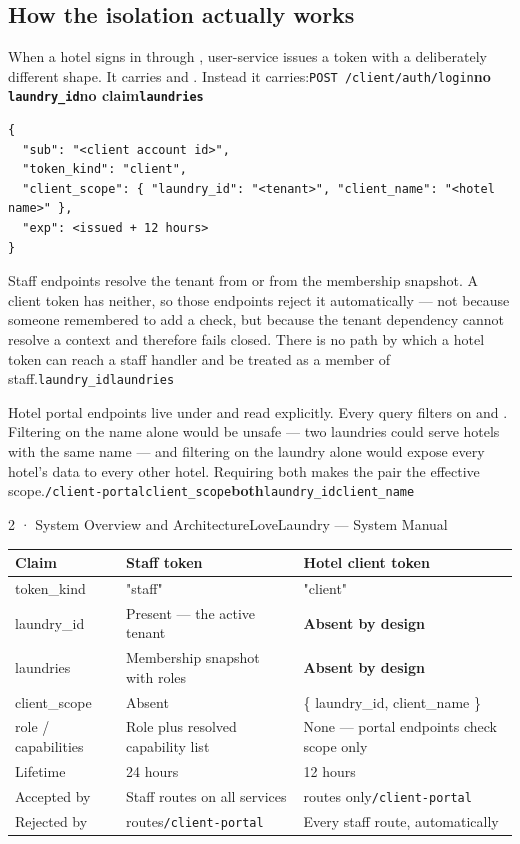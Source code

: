 \documentclass[11pt,a4paper,oneside]{book}
\begin{document}
\subsection*{How the isolation actually works}
When a hotel signs in through , user-service issues a token with a deliberately different shape. It carries  and . Instead it carries:\texttt{POST /client/auth/login}\textbf{no \texttt{laundry\_id}}\textbf{no  claim\texttt{laundries}}

\begin{verbatim}
{
  "sub": "<client account id>",
  "token_kind": "client",
  "client_scope": { "laundry_id": "<tenant>", "client_name": "<hotel name>" },
  "exp": <issued + 12 hours>
}
\end{verbatim}
Staff endpoints resolve the tenant from  or from the  membership snapshot. A client token has neither, so those endpoints reject it automatically — not because someone remembered to add a check, but because the tenant dependency cannot resolve a context and therefore fails closed. There is no path by which a hotel token can reach a staff handler and be treated as a member of staff.\texttt{laundry\_id}\texttt{laundries}

Hotel portal endpoints live under  and read  explicitly. Every query filters on   and . Filtering on the name alone would be unsafe — two laundries could serve hotels with the same name — and filtering on the laundry alone would expose every hotel's data to every other hotel. Requiring both makes the pair the effective scope.\texttt{/client-portal}\texttt{client\_scope}\textbf{both}\texttt{laundry\_id}\texttt{client\_name}

2 · System Overview and ArchitectureLoveLaundry — System Manual

\begin{center}\small
\begin{tabularx}{\linewidth}{|X|X|X|}
\hline
\rowcolor{lightgrey}
\textbf{Claim} & \textbf{Staff token} & \textbf{Hotel client token} \\ \hline
token\_kind & "staff" & "client" \\ \hline
laundry\_id & Present — the active tenant & \textbf{Absent by design} \\ \hline
laundries & Membership snapshot with roles & \textbf{Absent by design} \\ \hline
client\_scope & Absent & \{ laundry\_id, client\_name \} \\ \hline
role / capabilities & Role plus resolved capability list & None — portal endpoints check scope only \\ \hline
Lifetime & 24 hours & 12 hours \\ \hline
Accepted by & Staff routes on all services & routes only\texttt{/client-portal} \\ \hline
Rejected by & routes\texttt{/client-portal} & Every staff route, automatically \\ \hline
\end{tabularx}
\end{center}
\end{document}
